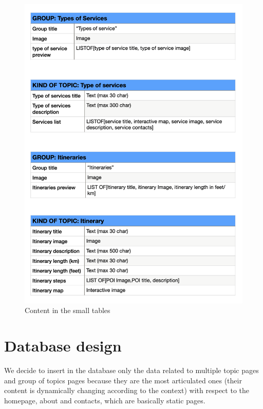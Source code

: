 \documentclass[table, 12pt]{article}
\begin{document}
\begin{figure}[H]
    \begin{center}
        \includegraphics[width=\textwidth]{assets/Tables/Small/contentSmall4.png}
        \caption{Content in the small tables}
    \end{center}
\end{figure}

\newpage
\section{Database design}
We decide to insert in the database only the data related to multiple topic pages and group of topics pages because they are the most articulated ones (their content is dynamically changing according to the context) with respect to the homepage, about and contacts, which are basically static pages.
\end{document}
